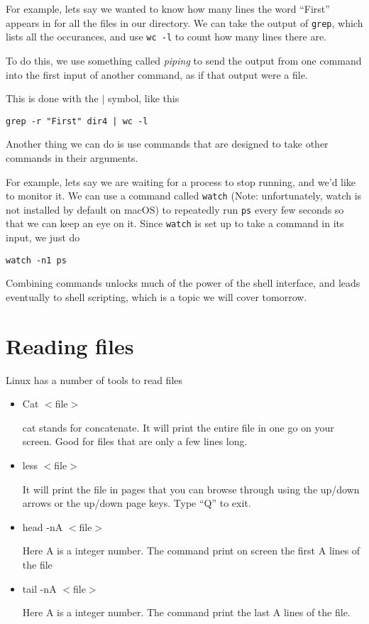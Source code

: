 \documentclass[aps,showpacs,prd,notitlepage,preprintnumbers,amsmath,amssymb,letterpaper]{revtex4}
\begin{document}
For example, lets say we wanted to know how many lines the word ``First'' appears in for all the files in our directory.
We can take the output of \verb|grep|, which lists all the occurances, and use \verb|wc -l| to count how many lines there are.

To do this, we use something called \textit{piping} to send the output from one command into the first input of another command, as if that output were a file.

This is done with the $|$ symbol, like this
\begin{verbatim}
grep -r "First" dir4 | wc -l
\end{verbatim}

Another thing we can do is use commands that are designed to take other commands in their arguments.

For example, lets say we are waiting for a process to stop running, and we'd like to monitor it.
We can use a command called \verb|watch| (Note: unfortunately, watch is not installed by default on macOS) to repeatedly run \verb|ps| every few seconds so that we can keep an eye on it.
Since \verb|watch| is set up to take a command in its input, we just do
\begin{verbatim}
watch -n1 ps
\end{verbatim}

Combining commands unlocks much of the power of the shell interface, and leads eventually to shell scripting, which is a topic we will cover tomorrow.

\section{Reading files}

Linux has a number of tools to read files

\begin{itemize}

\item Cat $<$file$>$

  cat stands for concatenate. It will print the entire file in one go on your screen. Good for files
  that are only a few lines long.

\item less $<$file$>$

  It will print the file in pages that you can browse through using the up/down arrows or the up/down
  page keys. Type ``Q'' to exit.

\item head -nA $<$file$>$

  Here A is a integer number. The command print on screen the first A lines of the file

\item tail -nA $<$file$>$

Here A is a integer number. The command print the last A lines of the file.

\end{itemize}
\end{document}
